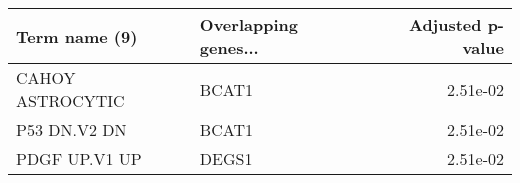 \begin{tabular}{llr}
\toprule
   Term name (9) & Overlapping genes... &  Adjusted p-value \\
\midrule
CAHOY ASTROCYTIC &                BCAT1 &          2.51e-02 \\
    P53 DN.V2 DN &                BCAT1 &          2.51e-02 \\
   PDGF UP.V1 UP &                DEGS1 &          2.51e-02 \\
\bottomrule
\end{tabular}
